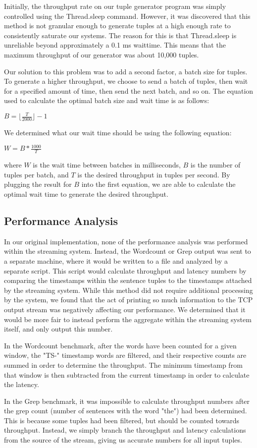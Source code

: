 Initially, the throughput rate on our tuple generator program was simply controlled using the Thread.sleep command.  However, it was discovered that this method is not granular enough to generate tuples at a high enough rate to consistently saturate our systems.  The reason for this is that Thread.sleep is unreliable beyond approximately a 0.1 ms waittime.  This means that the maximum throughput of our generator was about 10,000 tuples.

Our solution to this problem was to add a second factor, a batch size for
tuples.  To generate a higher throughput, we choose to send a batch of tuples,
then wait for a specified amount of time, then send the next batch, and so on.
The equation used to calculate the optimal batch size and wait time is as follows:

{\large $B = \lfloor\frac{T}{2000}\rfloor - 1$}

We determined what our wait time should be using the following equation:

{\large $W = B * \frac{1000}{T}$}

where $W$ is the wait time between batches in milliseconds, $B$ is the number of tuples per batch, and $T$ is the desired throughput in tuples per second.  By plugging the result for $B$ into the first equation, we are able to calculate the optimal wait time to generate the desired throughput.

\subsection{Performance Analysis}
In our original implementation, none of the performance analysis was performed within the streaming system.  Instead, the Wordcount or Grep output was sent to a separate machine, where it would be written to a file and analyzed by a separate script.  This script would calculate throughput and latency numbers by comparing the timestamps within the sentence tuples to the timestamps attached by the streaming system.  While this method did not require additional processing by the system, we found that the act of printing so much information to the TCP output stream was negatively affecting our performance.  We determined that it would be more fair to instead perform the aggregate within the streaming system itself, and only output this number.

In the Wordcount benchmark, after the words have been counted for a given window, the "TS-" timestamp words are filtered, and their respective counts are summed in order to determine the throughput.  The minimum timestamp from that window is then subtracted from the current timestamp in order to calculate the latency.

In the Grep benchmark, it was impossible to calculate throughput numbers after the grep count (number of sentences with the word "the") had been determined.  This is because some tuples had been filtered, but should be counted towards throughput.  Instead, we simply branch the throughput and latency calculations from the source of the stream, giving us accurate numbers for all input tuples.
